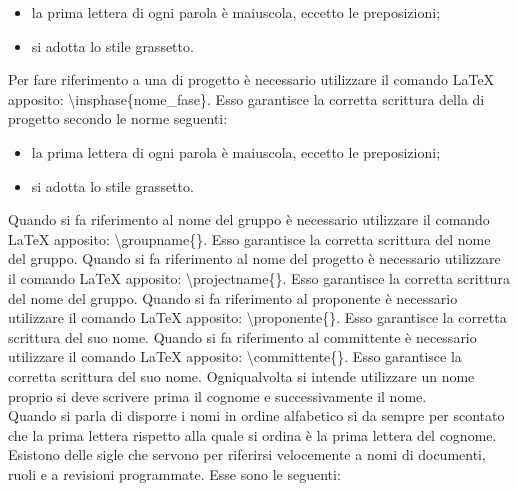 						\begin{itemize}
							\item la prima lettera di ogni parola è maiuscola, eccetto le preposizioni;
							\item si adotta lo stile grassetto.
						\end{itemize}
						Per fare riferimento a una  di progetto è necessario utilizzare il comando \LaTeX{} apposito: \textbackslash insphase\{nome\_fase\}. Esso garantisce la corretta scrittura della  di progetto secondo le norme seguenti:
						\begin{itemize}
							\item la prima lettera di ogni parola è maiuscola, eccetto le preposizioni;
							\item si adotta lo stile grassetto.
						\end{itemize}
						Quando si fa riferimento al nome del gruppo è necessario utilizzare il comando \LaTeX{} apposito: \textbackslash groupname\{\}. Esso garantisce la corretta scrittura del nome del gruppo.
						Quando si fa riferimento al nome del progetto è necessario utilizzare il comando \LaTeX{} apposito: \textbackslash projectname\{\}. Esso garantisce la corretta scrittura del nome del gruppo.
						Quando si fa riferimento al proponente è necessario utilizzare il comando \LaTeX{} apposito: \textbackslash proponente\{\}. Esso garantisce la corretta scrittura del suo nome.
						Quando si fa riferimento al committente è necessario utilizzare il comando \LaTeX{} apposito: \textbackslash committente\{\}. Esso garantisce la corretta scrittura del suo nome.
						Ogniqualvolta si intende utilizzare un nome proprio si deve scrivere prima il cognome e successivamente il nome.\\
						Quando si parla di disporre i nomi in ordine alfabetico si da sempre per scontato che la prima lettera rispetto alla quale si ordina è la prima lettera del cognome.
					\label{sec:sigle}
						Esistono delle sigle che servono per riferirsi velocemente a nomi di documenti, ruoli e a revisioni programmate. Esse sono le seguenti:
